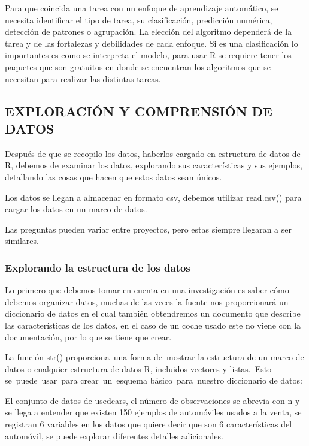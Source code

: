 \documentclass[
  letterpaper,
  DIV=11,
  numbers=noendperiod]{scrartcl}
\begin{document}
Para que coincida una tarea con un enfoque de aprendizaje automático, se
necesita identificar el tipo de tarea, su clasificación, predicción
numérica, detección de patrones o agrupación. La elección del algoritmo
dependerá de la tarea y de las fortalezas y debilidades de cada enfoque.
Si es una clasificación lo importantes es como se interpreta el modelo,
para usar R se requiere tener los paquetes que son gratuitos en donde se
encuentran los algoritmos que se necesitan para realizar las distintas
tareas.

\hypertarget{exploraciuxf3n-y-comprensiuxf3n-de-datos}{%
\subsection{\texorpdfstring{\textbf{EXPLORACIÓN Y COMPRENSIÓN DE
DATOS}}{EXPLORACIÓN Y COMPRENSIÓN DE DATOS}}\label{exploraciuxf3n-y-comprensiuxf3n-de-datos}}

Después de que se recopilo los datos, haberlos cargado en estructura de
datos de R, debemos de examinar los datos, explorando sus
características y sus ejemplos, detallando las cosas que hacen que estos
datos sean únicos.

Los datos se llegan a almacenar en formato csv, debemos utilizar
read.csv() para cargar los datos en un marco de datos.

Las preguntas pueden variar entre proyectos, pero estas siempre llegaran
a ser similares.

\hypertarget{explorando-la-estructura-de-los-datos}{%
\subsubsection{Explorando la estructura de los
datos}\label{explorando-la-estructura-de-los-datos}}

Lo primero que debemos tomar en cuenta en una investigación es saber
cómo debemos organizar datos, muchas de las veces la fuente nos
proporcionará un diccionario de datos en el cual también obtendremos un
documento que describe las características de los datos, en el caso de
un coche usado este no viene con la documentación, por lo que se tiene
que crear.

La función str() proporciona~una forma de~mostrar la estructura de un
marco de datos o cualquier estructura de datos R, incluidos vectores y
listas.~Esto se~puede~usar~para crear~un~esquema básico~para~nuestro
diccionario de datos:

El conjunto de datos de usedcars, el número de observaciones se abrevia
con n y se llega a entender que existen 150 ejemplos de automóviles
usados a la venta, se registran 6 variables en los datos que quiere
decir que son 6 características del automóvil, se puede explorar
diferentes detalles adicionales.
\end{document}
